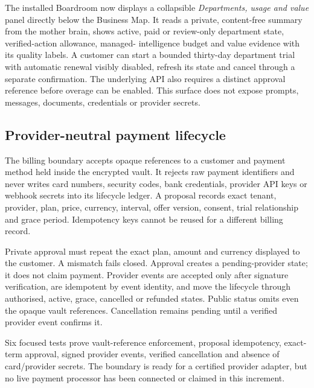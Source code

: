 The installed Boardroom now displays a collapsible \emph{Departments, usage and value} panel
directly below the Business Map. It reads a private, content-free summary from the mother brain,
shows active, paid or review-only department state, verified-action allowance, managed-
intelligence budget and value evidence with its quality labels. A customer can start a bounded
thirty-day department trial with automatic renewal visibly disabled, refresh its state and cancel
through a separate confirmation. The underlying API also requires a distinct approval reference
before overage can be enabled. This surface does not expose prompts, messages, documents,
credentials or provider secrets.

\subsection{Provider-neutral payment lifecycle}

The billing boundary accepts opaque references to a customer and payment method held inside the
encrypted vault. It rejects raw payment identifiers and never writes card numbers, security codes,
bank credentials, provider API keys or webhook secrets into its lifecycle ledger. A proposal
records exact tenant, provider, plan, price, currency, interval, offer version, consent, trial
relationship and grace period. Idempotency keys cannot be reused for a different billing record.

Private approval must repeat the exact plan, amount and currency displayed to the customer. A
mismatch fails closed. Approval creates a pending-provider state; it does not claim payment.
Provider events are accepted only after signature verification, are idempotent by event identity,
and move the lifecycle through authorised, active, grace, cancelled or refunded states. Public
status omits even the opaque vault references. Cancellation remains pending until a verified
provider event confirms it.

Six focused tests prove vault-reference enforcement, proposal idempotency, exact-term approval,
signed provider events, verified cancellation and absence of card/provider secrets. The boundary
is ready for a certified provider adapter, but no live payment processor has been connected or
claimed in this increment.

